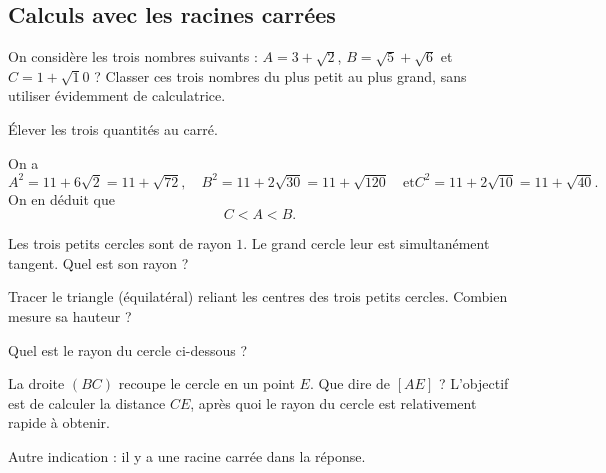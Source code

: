 \subsection{Calculs avec les racines carrées}

\begin{exo}

On considère les trois nombres suivants : $A=3+\sqrt 2$, $B=\sqrt 5 +\sqrt 6$ et $C=1+\sqrt 10$ ?
Classer ces trois nombres du plus petit au plus grand, sans utiliser évidemment de calculatrice.
\begin{hint}
Élever les trois quantités au carré.
\end{hint}
\begin{sol}
On a 
\[
A^2 = 11+6\sqrt 2 = 11+\sqrt{72},\quad
B^2 = 11+2\sqrt{30}=11+\sqrt{120} \quad\text{et}
C^2 = 11+2\sqrt{10}=11+\sqrt{40}.\]
On en déduit que 
\[ C< A < B.\]
\end{sol}
\end{exo}




\begin{exo}
Les trois petits  cercles sont de rayon $1$.
Le grand cercle leur est simultanément tangent. Quel est son rayon ?
\begin{center}
\end{center}
\begin{hint}
Tracer le triangle (équilatéral) reliant les centres des trois petits cercles. Combien mesure  sa hauteur ?
\end{hint}
\end{exo}




\begin{exo}
Quel est le rayon du cercle ci-dessous ?
\begin{center}
\end{center}
\begin{hint}
La droite $(BC)$ recoupe le cercle en  un point $E$. Que dire de $[AE]$ ?
L'objectif est de calculer la distance $CE$, après quoi le rayon du cercle est relativement rapide à obtenir.

Autre indication : il y a une racine carrée dans la réponse.
\end{hint}
\end{exo}

